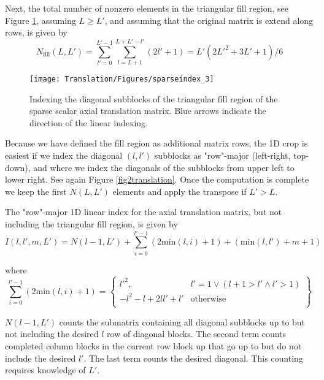 Next, the total number of nonzero elements in the triangular fill region, see Figure \ref{fig2translation2}, assuming $L \ge L'$, and assuming that the original matrix is extend along rows, is given by 
\begin{equation}
N_{\textrm{fill}}(L,L') = \sum_{l' = 0}^{L'-1} \sum_{l=L+1}^{L + L' - l'} \left( 2 l' + 1 \right) = L'(2L'^2 + 3L' + 1)/6  \label{eq:a2}\end{equation}



\begin{figure}[H] 
   \centering
      \texttt{[image: Translation/Figures/sparseindex\_3]} 
   \caption{Indexing the diagonal subblocks of the triangular fill region of the sparse scalar axial translation matrix. Blue arrows indicate the direction of the linear indexing. }
   \label{fig2translation2}
\end{figure}


Because we have defined the fill region as additional matrix rows, the 1D crop is easiest if we index the diagonal $(l,l')$ subblocks as "row"-major (left-right, top-down), and where we index the diagonals of the subblocks from upper left to lower right. See again Figure \ref{fig2translation}. Once the computation is complete we keep the first $N(L,L')$ elements and apply the transpose if $L' > L$.  

The "row"-major 1D linear index for the axial translation matrix, but not including the triangular fill region, is given by  
\begin{equation}
I(l,l',m,L') = N(l-1,L') + \sum_{i = 0}^{l'-1}  (2\textrm{min}(l,i) + 1)  + (\textrm{min}(l,l') + m + 1)   \label{eq:a3}
\end{equation}

\noindent where
\begin{equation}
\sum_{i = 0}^{l'-1}  (2\textrm{min}(l,i) + 1) = 
\left\{\begin{array}{cc} 
l'^2, & l' = 1 \lor ( l+1>l' \land l' > 1) \\
-l^2 - l + 2ll' + l' & \textrm{otherwise} \\
\end{array}
\right\}
\end{equation}  

$N(l-1,L')$ counts the submatrix containing all diagonal subblocks up to but not including the desired $l$ row of diagonal blocks. The second term counts completed column blocks in the current row block up that go up to but do not include the desired $l'$. The last term counts the desired diagonal. This counting requires knowledge of $L'$.

